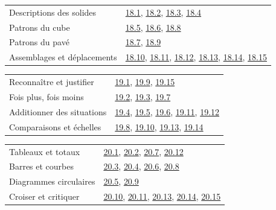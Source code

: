 \begin{tabularx}{\linewidth}{@{}Yl@{}}\toprule
Descriptions des solides & \hyperref[exo-18-1]{18.1}, \hyperref[exo-18-2]{18.2}, \hyperref[exo-18-3]{18.3}, \hyperref[exo-18-4]{18.4}\\[2mm]
Patrons du cube & \hyperref[exo-18-5]{18.5}, \hyperref[exo-18-6]{18.6}, \hyperref[exo-18-8]{18.8}\\[2mm]
Patrons du pavé & \hyperref[exo-18-7]{18.7}, \hyperref[exo-18-9]{18.9}\\[2mm]
Assemblages et déplacements & \hyperref[exo-18-10]{18.10}, \hyperref[exo-18-11]{18.11}, \hyperref[exo-18-12]{18.12}, \hyperref[exo-18-13]{18.13}, \hyperref[exo-18-14]{18.14}, \hyperref[exo-18-15]{18.15}\\[2mm]
\bottomrule\end{tabularx}\par\vspace{4mm}
\clearpage
{}\fontsize{10}{13}\selectfont
{}\begin{tabularx}{\linewidth}{@{}Yl@{}}\toprule
Reconnaître et justifier & \hyperref[exo-19-1]{19.1}, \hyperref[exo-19-9]{19.9}, \hyperref[exo-19-15]{19.15}\\[2mm]
Fois plus, fois moins & \hyperref[exo-19-2]{19.2}, \hyperref[exo-19-3]{19.3}, \hyperref[exo-19-7]{19.7}\\[2mm]
Additionner des situations & \hyperref[exo-19-4]{19.4}, \hyperref[exo-19-5]{19.5}, \hyperref[exo-19-6]{19.6}, \hyperref[exo-19-11]{19.11}, \hyperref[exo-19-12]{19.12}\\[2mm]
Comparaisons et échelles & \hyperref[exo-19-8]{19.8}, \hyperref[exo-19-10]{19.10}, \hyperref[exo-19-13]{19.13}, \hyperref[exo-19-14]{19.14}\\[2mm]
\bottomrule\end{tabularx}\par\vspace{4mm}
\begin{tabularx}{\linewidth}{@{}Yl@{}}\toprule
Tableaux et totaux & \hyperref[exo-20-1]{20.1}, \hyperref[exo-20-2]{20.2}, \hyperref[exo-20-7]{20.7}, \hyperref[exo-20-12]{20.12}\\[2mm]
Barres et courbes & \hyperref[exo-20-3]{20.3}, \hyperref[exo-20-4]{20.4}, \hyperref[exo-20-6]{20.6}, \hyperref[exo-20-8]{20.8}\\[2mm]
Diagrammes circulaires & \hyperref[exo-20-5]{20.5}, \hyperref[exo-20-9]{20.9}\\[2mm]
Croiser et critiquer & \hyperref[exo-20-10]{20.10}, \hyperref[exo-20-11]{20.11}, \hyperref[exo-20-13]{20.13}, \hyperref[exo-20-14]{20.14}, \hyperref[exo-20-15]{20.15}\\[2mm]
\bottomrule\end{tabularx}\par\vspace{4mm}
